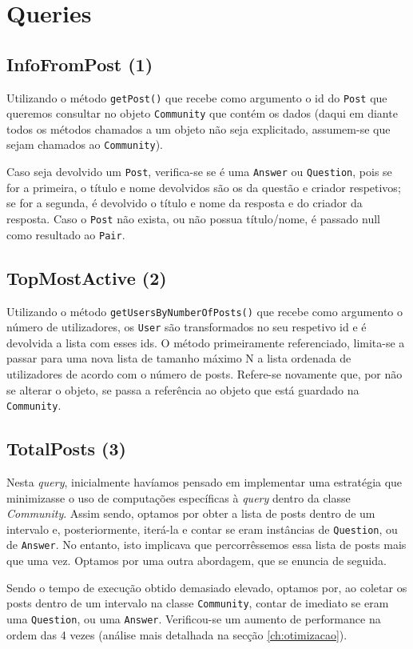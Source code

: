 \documentclass[a4paper]{article}
\begin{document}
\section{Queries}
	\subsection{InfoFromPost (1)}
		\tab Utilizando o método \texttt{getPost()} que recebe como argumento o id do \texttt{Post}
		que queremos consultar no objeto \texttt{Community} que contém os dados (daqui em diante
		todos os métodos chamados a um objeto não seja explicitado, assumem-se que sejam chamados
		ao \texttt{Community}).
		\par Caso seja devolvido um \texttt{Post}, verifica-se se é uma \texttt{Answer} ou \texttt{Question},
		pois se for a primeira, o título e nome devolvidos são os da questão e criador respetivos; se for a
		segunda, é devolvido o título e nome da resposta e do criador da resposta. Caso o \texttt{Post} não exista,
		ou não possua título/nome, é passado null como resultado ao \texttt{Pair}.

	\subsection{TopMostActive (2)}
	 \tab Utilizando o método \texttt{getUsersByNumberOfPosts()} que recebe como argumento
	 o número de utilizadores, os \texttt{User} são transformados no seu respetivo id e é
	 devolvida a lista com esses ids. O método primeiramente referenciado, limita-se a
	 passar para uma nova lista de tamanho máximo N a lista ordenada de utilizadores
	 de acordo com o número de posts. Refere-se novamente que, por não se alterar
	 o objeto, se passa a referência ao objeto que está guardado na \texttt{Community}.

	\subsection{TotalPosts (3)}
		\tab Nesta \textit{query}, inicialmente havíamos pensado em implementar uma estratégia
		que minimizasse o uso de computações específicas à \textit{query} dentro da classe \textit{Community}.
		Assim sendo, optamos por obter a lista de posts dentro de um intervalo e, posteriormente,
		iterá-la e contar se eram instâncias de \texttt{Question}, ou de \texttt{Answer}. No entanto, isto implicava
		que percorrêssemos essa lista de posts mais que uma vez. Optamos por uma outra abordagem, que se enuncia de seguida.
		\par Sendo o tempo de execução obtido demasiado elevado, optamos por, ao coletar os posts dentro
		de um intervalo na classe \texttt{Community}, contar de imediato se eram uma \texttt{Question}, ou uma \texttt{Answer}. Verificou-se um aumento
		de performance na ordem das 4 vezes (análise mais detalhada na secção \ref{ch:otimizacao}).
\end{document}

